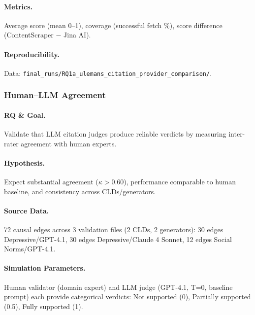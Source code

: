 \paragraph{Metrics.}
Average score (mean 0--1), coverage (successful fetch \%), score difference (ContentScraper $-$ Jina AI).

\paragraph{Reproducibility.}
Data: \texttt{final\_runs/RQ1a\_ulemans\_citation\_provider\_comparison/}.

\subsubsection{Human--LLM Agreement}
\label{sec:human_llm_agreement}

\paragraph{RQ \& Goal.}
Validate that LLM citation judges produce reliable verdicts by measuring inter-rater agreement with human experts.

\paragraph{Hypothesis.}
Expect substantial agreement ($\kappa > 0.60$), performance comparable to human baseline, and consistency across CLDs/generators.

\paragraph{Source Data.}
72 causal edges across 3 validation files (2 CLDs, 2 generators): 30 edges Depressive/GPT-4.1, 30 edges Depressive/Claude 4 Sonnet, 12 edges Social Norms/GPT-4.1.

\paragraph{Simulation Parameters.}
Human validator (domain expert) and LLM judge (GPT-4.1, T=0, baseline prompt) each provide categorical verdicts: Not supported (0), Partially supported (0.5), Fully supported (1).

